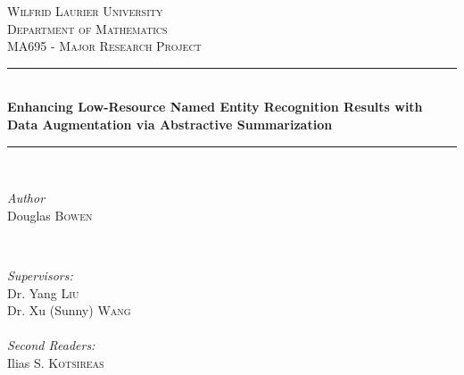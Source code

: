 \documentclass[12pt]{report}
\begin{document}

\begin{titlepage} %
	\newcommand{\HRule}{\rule{\linewidth}{0.5mm}} %
	
	\center %
	
	
	\textsc{\LARGE Wilfrid Laurier University}\\[1.5cm] %
	
	\textsc{\Large Department of Mathematics}\\[0.5cm] %
	
	\textsc{\large MA695 - Major Research Project}\\[0.5cm] %
	
	
	\HRule\\[0.4cm]
	
	{\huge\bfseries Enhancing Low-Resource Named Entity Recognition Results with Data Augmentation via Abstractive Summarization}\\[0.4cm] %
	
	\HRule\\[1.5cm]
	
	
	\begin{minipage}{0.4\textwidth}
		\begin{flushleft}
			\large
			\textit{Author}\\
			Douglas \textsc{Bowen}\\%
		\end{flushleft}
	\end{minipage}
	~
	\begin{minipage}{0.4\textwidth}
		\begin{flushright}
			\large
			\textit{Supervisors:}\\
			Dr. Yang \textsc{Liu}\\
			Dr. Xu (Sunny) \textsc{Wang}\\
			\text{ }\\
			\textit{Second Readers:}\\
			Ilias S. \textsc{Kotsireas}
		\end{flushright}
	\end{minipage}
	

\end{titlepage}
\end{document}
